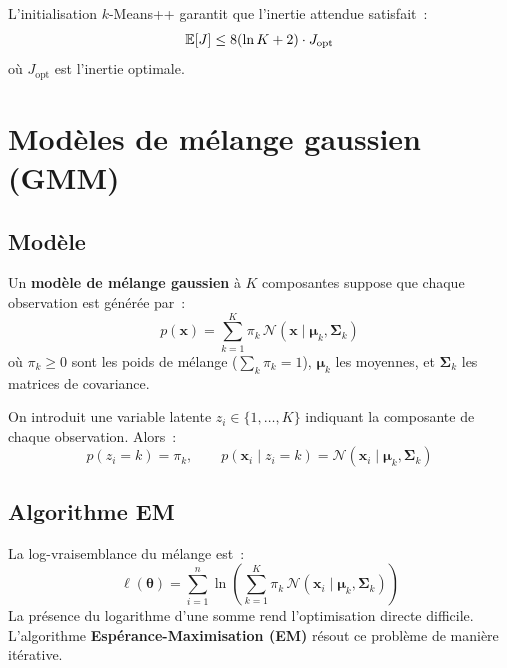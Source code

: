 \begin{theoreme}
L'initialisation $k$-Means++ garantit que l'inertie attendue satisfait~:
\begin{equation}
  \mathbb{E}[J] \leq 8(\ln K + 2) \cdot J_{\text{opt}}
\end{equation}
o\`u $J_{\text{opt}}$ est l'inertie optimale.
\end{theoreme}

\section{Mod\`eles de m\'elange gaussien (GMM)}
\label{sec:gmm}

\subsection{Mod\`ele}

\begin{definition}
Un \textbf{mod\`ele de m\'elange gaussien} \`a $K$ composantes suppose que
chaque observation est g\'en\'er\'ee par~:
\begin{equation}
  p(\bm{x}) = \sum_{k=1}^K \pi_k \, \mathcal{N}(\bm{x} \mid \bm{\mu}_k,
  \bm{\Sigma}_k)
  \label{eq:gmm}
\end{equation}
o\`u $\pi_k \geq 0$ sont les poids de m\'elange ($\sum_k \pi_k = 1$),
$\bm{\mu}_k$ les moyennes, et $\bm{\Sigma}_k$ les matrices de covariance.
\end{definition}

On introduit une variable latente $z_i \in \{1, \ldots, K\}$ indiquant la
composante de chaque observation. Alors~:
\begin{equation}
  p(z_i = k) = \pi_k, \qquad p(\bm{x}_i \mid z_i = k) =
  \mathcal{N}(\bm{x}_i \mid \bm{\mu}_k, \bm{\Sigma}_k)
\end{equation}

\subsection{Algorithme EM}

La log-vraisemblance du m\'elange est~:
\begin{equation}
  \ell(\bm{\theta}) = \sum_{i=1}^n \ln \left( \sum_{k=1}^K \pi_k \,
  \mathcal{N}(\bm{x}_i \mid \bm{\mu}_k, \bm{\Sigma}_k) \right)
\end{equation}
La pr\'esence du logarithme d'une somme rend l'optimisation directe difficile.
L'algorithme \textbf{Esp\'erance-Maximisation (EM)} r\'esout ce probl\`eme de
mani\`ere it\'erative.

